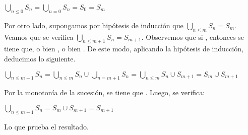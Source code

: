 \begin{isabellebody}
\begin{isamarkuptext}
\begin{demostracion}
  $\bigcup_{n \leq 0} S_{n} = \bigcup_{n = 0} S_{n} = S_{0} = S_{m}$

  Por otro lado, supongamos por hipótesis de inducción que $\bigcup_{n \leq m} S_{n} = S_{m}$.
  Veamos que se verifica $\bigcup_{n \leq m + 1} S_{n} = S_{m + 1}$. Observemos que si ,
  entonces se tiene que, o bien , o bien . De este modo, aplicando la 
  hipótesis de inducción, deducimos lo siguiente.

  $\bigcup_{n \leq m + 1} S_{n} = \bigcup_{n \leq m} S_{n} \cup \bigcup_{n = m + 1} S_{n} = \bigcup_{n \leq m} S_{n} \cup S_{m + 1} = S_{m} \cup S_{m + 1}$

  Por la monotonía de la sucesión, se tiene que . Luego, se verifica:

  $\bigcup_{n \leq m + 1} S_{n} = S_{m} \cup S_{m + 1} = S_{m + 1}$

  Lo que prueba el resultado.
\end{demostracion}


\end{isamarkuptext}
\end{isabellebody}
